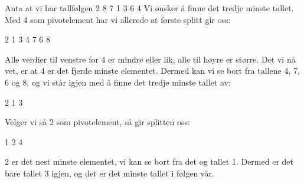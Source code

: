 \begin{boxed}
Anta at vi har tallfølgen 2 8 7 1 3 6 4
\newline\newline
Vi ønsker å finne det tredje minste tallet. Med 4 som pivotelement har vi allerede at første splitt gir oss:
\begin{center}
2 1 3 4 7 6 8
\end{center}
Alle verdier til venstre for 4 er mindre eller lik, alle til høyre er større. Det vi nå vet, er at 4 er det fjerde minste elementet. Dermed kan vi se bort fra tallene 4, 7, 6 og 8, og vi står igjen med å finne det tredje minste tallet av:
\begin{center}
2 1 3
\end{center}
Velger vi så 2 som pivotelement, så gir splitten oss:
\begin{center}
1 2 4
\end{center}
2 er det nest minste elementet, vi kan se bort fra det og tallet 1. Dermed er det bare tallet 3 igjen, og det er det minste tallet i følgen vår.
\end{boxed}

